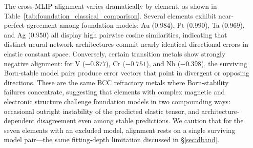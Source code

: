 \documentclass[twocolumn,9pt]{extarticle}
\begin{document}
The cross-MLIP alignment varies dramatically by element, as shown in Table~\ref{tab:foundation_classical_comparison}. Several elements exhibit near-perfect agreement among foundation models: Au ($0.984$), Pt ($0.990$), Ta ($0.969$), and Ag ($0.950$) all display high pairwise cosine similarities, indicating that distinct neural network architectures commit nearly identical directional errors in elastic constant space. Conversely, certain transition metals show strongly negative alignment: for V ($-0.877$), Cr ($-0.751$), and Nb ($-0.398$), the surviving Born-stable model pairs produce error vectors that point in divergent or opposing directions. These are the same BCC refractory metals where Born-stability failures concentrate, suggesting that elements with complex magnetic and electronic structure challenge foundation models in two compounding ways: occasional outright instability of the predicted elastic tensor, and architecture-dependent disagreement even among stable predictions. We caution that for the seven elements with an excluded model, alignment rests on a single surviving model pair---the same fitting-depth limitation discussed in \S\ref{sec:dband}.
\end{document}
